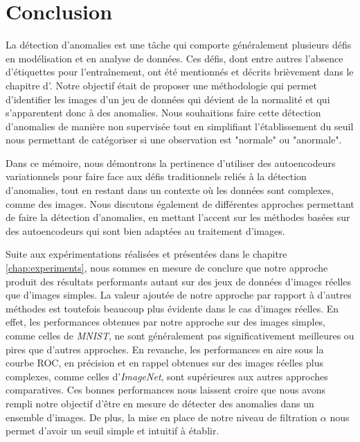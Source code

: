 \chapter*{Conclusion}           %
\label{chap:conclusion}         %

La détection d'anomalies est une tâche qui comporte généralement plusieurs défis en modélisation et en analyse de données. Ces défis, dont entre autres l'absence d'étiquettes pour l'entraînement, ont été mentionnés et décrits brièvement dans le chapitre d'. Notre objectif était de proposer une méthodologie qui permet d'identifier les images d'un jeu de données qui dévient de la normalité et qui s'apparentent donc à des anomalies. Nous souhaitions faire cette détection d'anomalies de manière non supervisée tout en simplifiant l'établissement du seuil nous permettant de catégoriser si une observation est "normale" ou  "anormale". 

Dans ce mémoire, nous démontrons la pertinence d'utiliser des autoencodeurs variationnels pour faire face aux défis traditionnels reliés à la détection d'anomalies, tout en restant \DIFdelbegin {}\DIFdelend \DIFaddbegin {}\DIFaddend dans un contexte où les données sont complexes, comme des images. Nous discutons également de différentes approches permettant de faire la détection d'anomalies, en mettant l'accent sur les méthodes basées sur des autoencodeurs qui sont bien adaptées au traitement d'images. \DIFaddbegin {}\DIFaddend 

Suite aux expérimentations réalisées et présentées dans le chapitre \ref{chap:experiments}, nous sommes en mesure de conclure que notre approche produit des résultats performants autant sur des jeux de données d'images réelles que d'images simples. La valeur ajoutée de notre approche par rapport à d'autres méthodes est toutefois beaucoup plus évidente dans le cas d'images réelles. En effet, les performances obtenues par notre approche sur des images simples, comme celles de \textit{MNIST}, ne sont généralement pas significativement meilleures ou pires que d'autres approches. En revanche, les performances en aire sous la courbe ROC, en précision et en rappel obtenues sur des images réelles plus complexes, comme celles d'\textit{ImageNet}, sont supérieures aux autres approches comparatives. Ces bonnes performances nous laissent croire que nous avons rempli notre objectif d'être en mesure de détecter des anomalies dans un ensemble d'images. De plus, la mise en place de notre niveau de filtration $\alpha$ nous permet d'avoir un seuil simple et intuitif à établir. \DIFaddbegin {}\DIFaddend 


